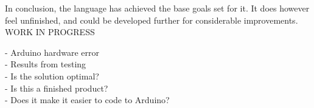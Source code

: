 In conclusion, the language has achieved the base goals set for it. It does however feel unfinished, and could be developed further for considerable improvements. \\

WORK IN PROGRESS

 - Arduino hardware error \\
 - Results from testing \\
 - Is the solution optimal? \\
 - Is this a finished product? \\
 - Does it make it easier to code to Arduino? \\